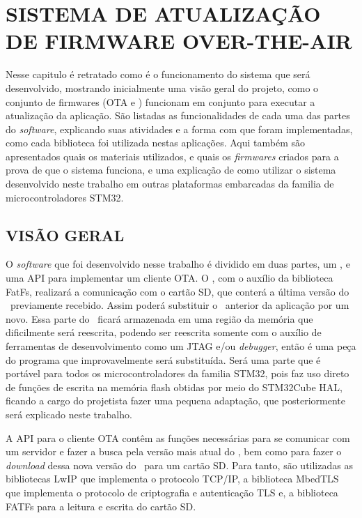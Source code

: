 
\chapter{SISTEMA DE ATUALIZAÇÃO DE FIRMWARE OVER-THE-AIR}
\label{chap:metodologia}
Nesse capitulo é retratado como é o funcionamento do sistema que será desenvolvido, mostrando inicialmente uma visão geral do projeto, como o conjunto de firmwares (OTA e \bootloader) funcionam em conjunto para executar a atualização da aplicação. São listadas as funcionalidades de cada uma das partes do \textit{software}, explicando suas atividades e a forma com que foram implementadas, como cada biblioteca foi utilizada nestas aplicações. Aqui também são apresentados quais os materiais utilizados, e quais os \textit{firmwares} criados para a prova de que o sistema funciona, e uma explicação de como utilizar o sistema desenvolvido neste trabalho em outras plataformas embarcadas da familia de microcontroladores STM32.

\section{VISÃO GERAL}
O \textit{software} que foi desenvolvido nesse trabalho é dividido em duas partes, um \bootloader, e uma API para implementar um cliente OTA. O \bootloader, com o auxílio da biblioteca FatFs, realizará a comunicação com o cartão SD, que conterá a última versão do \firmware\ previamente recebido. Assim poderá substituir o \software\ anterior da aplicação por um novo. Essa parte do \software\ ficará armazenada em uma região da memória que dificilmente será reescrita, podendo ser reescrita somente com o auxílio de ferramentas de desenvolvimento como um JTAG e/ou \textit{debugger}, então é uma peça do programa que improvavelmente será substituída. Será uma parte que é portável para todos os microcontroladores da familia STM32, pois faz uso direto de funções de escrita na memória flash obtidas por meio do STM32Cube HAL, ficando a cargo do projetista fazer uma pequena adaptação, que posteriormente será explicado neste trabalho.

A API para o cliente OTA contêm as funções necessárias para se comunicar com um servidor e fazer a busca pela versão mais atual do \firmware, bem como para fazer o \textit{download} dessa nova versão do \firmware\ para um cartão SD. Para tanto, são utilizadas as bibliotecas LwIP que implementa o protocolo TCP/IP, a biblioteca MbedTLS que implementa o protocolo de criptografia e autenticação TLS e, a biblioteca FATFs para a leitura e escrita do cartão SD.

